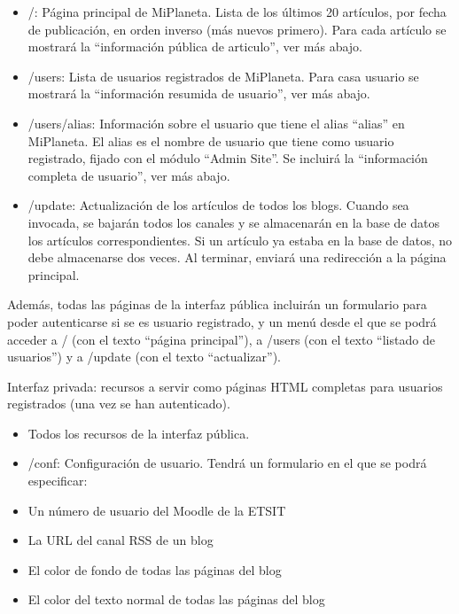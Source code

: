 \begin{itemize}
\item /: Página principal de MiPlaneta. Lista de los últimos 20 artículos, por fecha de publicación, en orden inverso (más nuevos primero). Para cada artículo se mostrará la ``información pública de articulo'', ver más abajo.

\item /users: Lista de usuarios registrados de MiPlaneta. Para casa usuario se mostrará la ``información resumida de usuario'', ver más abajo.

\item /users/alias: Información sobre el usuario que tiene el alias ``alias'' en MiPlaneta. El alias es el nombre de usuario que tiene como usuario registrado, fijado con el módulo ``Admin Site''. Se incluirá la ``información completa de usuario'', ver más abajo.

\item /update: Actualización de los artículos de todos los blogs. Cuando sea invocada, se bajarán todos los canales y se almacenarán en la base de datos los artículos correspondientes. Si un artículo ya estaba en la base de datos, no debe almacenarse dos veces. Al terminar, enviará una redirección a la página principal.
\end{itemize}

Además, todas las páginas de la interfaz pública incluirán un formulario para poder autenticarse si se es usuario registrado, y un menú desde el que se podrá acceder a / (con el texto ``página principal''), a /users (con el texto ``listado de usuarios'') y a /update (con el texto ``actualizar'').

Interfaz privada: recursos a servir como páginas HTML completas para usuarios registrados (una vez se han autenticado).

\begin{itemize}
\item Todos los recursos de la interfaz pública.
\item /conf: Configuración de usuario. Tendrá un formulario en el que se podrá especificar:
  \item Un número de usuario del Moodle de la ETSIT
  \item La URL del canal RSS de un blog
  \item El color de fondo de todas las páginas del blog
  \item El color del texto normal de todas las páginas del blog
\end{itemize}

